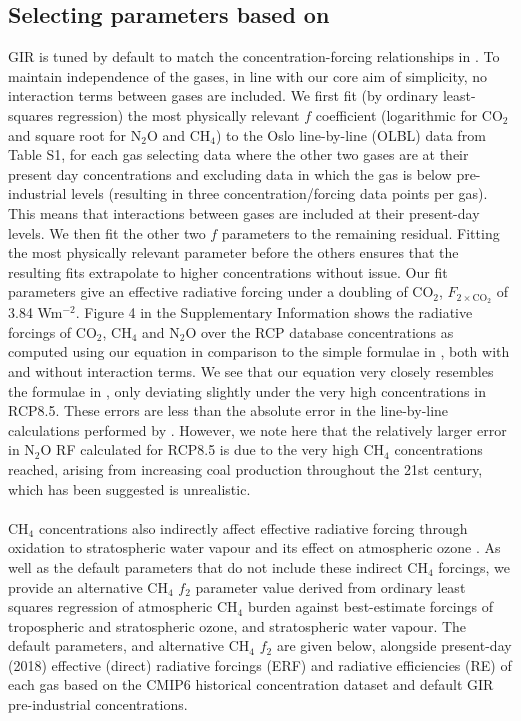 \documentclass[gmd, manuscript]{copernicus}
\begin{document}
\subsection*{Selecting parameters based on \cite{Etminan2016}}
GIR is tuned by default to match the concentration-forcing relationships in \cite{Etminan2016}. To maintain independence of the gases, in line with our core aim of simplicity, no interaction terms between gases are included. We first fit (by ordinary least-squares regression) the most physically relevant $f$ coefficient (logarithmic for CO$_2$ and square root for N$_2$O and CH$_4$) to the Oslo line-by-line (OLBL) data from \cite{Etminan2016} Table S1, for each gas selecting data where the other two gases are at their present day concentrations and excluding data in which the gas is below pre-industrial levels (resulting in three concentration/forcing data points per gas). This means that interactions between gases are included at their present-day levels. We then fit the other two $f$ parameters to the remaining residual. Fitting the most physically relevant parameter before the others ensures that the resulting fits extrapolate to higher concentrations without issue. Our fit parameters give an effective radiative forcing under a doubling of CO$_2$, $F_{2\times \text{CO}_2}$ of 3.84 Wm$^{-2}$. Figure 4 in the Supplementary Information shows the radiative forcings of CO$_2$, CH$_4$ and N$_2$O over the RCP database concentrations as computed using our equation in comparison to the simple formulae in \citeauthor{Etminan2016}, both with and without interaction terms. We see that our equation very closely resembles the formulae in \citeauthor{Etminan2016}, only deviating slightly under the very high concentrations in RCP8.5. These errors are less than the absolute error in the line-by-line calculations performed by \citeauthor{Etminan2016}. However, we note here that the relatively larger error in N$_2$O RF calculated for RCP8.5 is due to the very high CH$_4$ concentrations reached, arising from increasing coal production throughout the 21st century, which has been suggested is unrealistic.\\\\
CH$_4$ concentrations also indirectly affect effective radiative forcing through oxidation to stratospheric water vapour and its effect on atmospheric ozone \citep{Noel2018,Owens1982,Myhre2013a}. As well as the default parameters that do not include these indirect CH$_4$ forcings, we provide an alternative CH$_4$ $f_2$ parameter value derived from ordinary least squares regression of atmospheric CH$_4$ burden against best-estimate forcings of tropospheric and stratospheric ozone, and stratospheric water vapour. The default parameters, and alternative CH$_4$ $f_2$ are given below, alongside present-day (2018) effective (direct) radiative forcings (ERF) and radiative efficiencies (RE) of each gas based on the CMIP6 historical concentration dataset \citep{Meinshausen2017} and default GIR pre-industrial concentrations.
\end{document}
